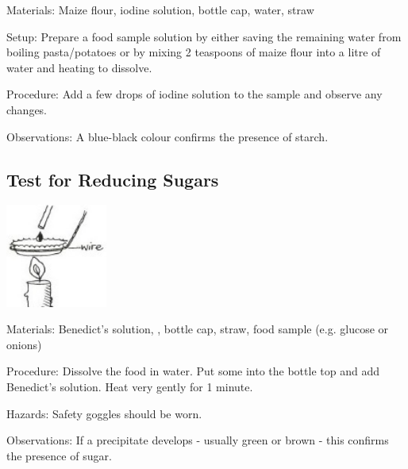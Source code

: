 \begin{multicols}{2}
\begin{description*}
\item[Materials:]{Maize flour, iodine solution, bottle cap, water, straw}
\item[Setup:]{Prepare a food sample solution by either saving the remaining water from boiling pasta/potatoes or by mixing 2 teaspoons of maize flour into a litre of water and heating to dissolve.}
\item[Procedure:]{Add a few drops of iodine solution to the sample and observe any changes.}
\item[Observations:]{A blue-black colour confirms the presence of starch.}
\end{description*}


\columnbreak

\subsection{Test for Reducing Sugars} %

\begin{center}
\includegraphics[width=0.25\textwidth]{./img/vso/food-test-reducing.jpg}
\end{center}

\begin{description*}
\item[Materials:]{Benedict's solution, , bottle cap, straw, food sample (e.g. glucose or onions)}
\item[Procedure:]{Dissolve the food in water. Put
some into the bottle top and add
Benedict's solution.
Heat very gently for 1 minute.}
\item[Hazards:]{Safety goggles should be worn. }
\item[Observations:]{If
a precipitate develops - usually
green or brown - this confirms
the presence of sugar.}
\end{description*}


\end{multicols}
